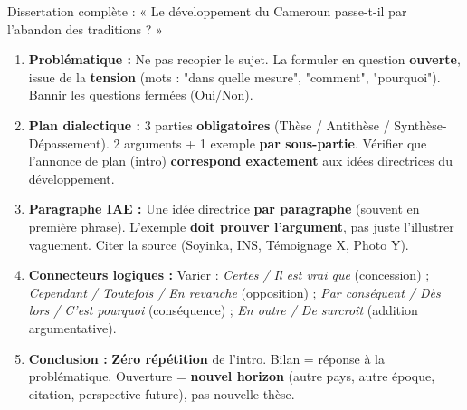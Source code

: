 \documentclass[11pt]{article}
\begin{document}
\begin{exoresolu}{Dissertation complète : « Le développement du Cameroun passe-t-il par l'abandon des traditions ? »}
\begin{aretenir}
\begin{enumerate}
    \item \textbf{Problématique :} Ne pas recopier le sujet. La formuler en question \textbf{ouverte}, issue de la \textbf{tension} (mots : "dans quelle mesure", "comment", "pourquoi"). Bannir les questions fermées (Oui/Non).
    \item \textbf{Plan dialectique :} 3 parties \textbf{obligatoires} (Thèse / Antithèse / Synthèse-Dépassement). 2 arguments + 1 exemple \textbf{par sous-partie}. Vérifier que l'annonce de plan (intro) \textbf{correspond exactement} aux idées directrices du développement.
    \item \textbf{Paragraphe IAE :} Une idée directrice \textbf{par paragraphe} (souvent en première phrase). L'exemple \textbf{doit prouver l'argument}, pas juste l'illustrer vaguement. Citer la source (Soyinka, INS, Témoignage X, Photo Y).
    \item \textbf{Connecteurs logiques :} Varier : \emph{Certes / Il est vrai que} (concession) ; \emph{Cependant / Toutefois / En revanche} (opposition) ; \emph{Par conséquent / Dès lors / C'est pourquoi} (conséquence) ; \emph{En outre / De surcroît} (addition argumentative).
    \item \textbf{Conclusion :} \textbf{Zéro répétition} de l'intro. Bilan = réponse à la problématique. Ouverture = \textbf{nouvel horizon} (autre pays, autre époque, citation, perspective future), pas nouvelle thèse.
\end{enumerate}
\end{aretenir}

\end{exoresolu}
\end{document}

